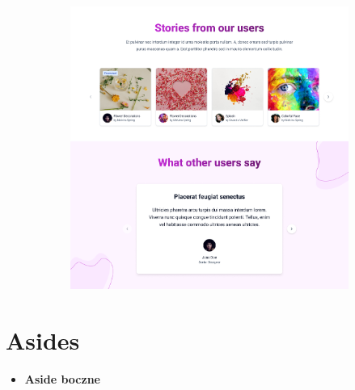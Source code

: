 \documentclass[
  a4paper,
  DIV=11,
  numbers=noendperiod,
  oneside,
  open=any]{scrreprt}
\providecommand{\tightlist}{%
  \setlength{\itemsep}{0pt}\setlength{\parskip}{0pt}}\usepackage{longtable,booktabs,array}
\begin{document}
\begin{figure}
\begin{minipage}{0.33\linewidth}
\begin{figure}[H]
{}


\end{figure}%

\end{minipage}%
%
\begin{minipage}{0.33\linewidth}

\begin{figure}[H]

{\centering \includegraphics{images/wniosek3.png}

}


\end{figure}%

\end{minipage}%

\end{figure}%

\section{Asides}\label{asides}

\begin{itemize}
\tightlist
\item
  \textbf{Aside boczne}
\end{itemize}
\end{document}
